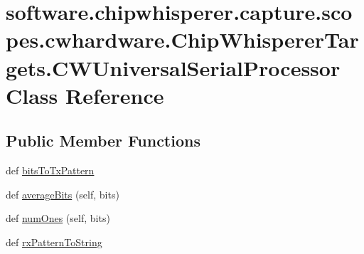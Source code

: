 \hypertarget{classsoftware_1_1chipwhisperer_1_1capture_1_1scopes_1_1cwhardware_1_1ChipWhispererTargets_1_1CWUniversalSerialProcessor}{}\section{software.\+chipwhisperer.\+capture.\+scopes.\+cwhardware.\+Chip\+Whisperer\+Targets.\+C\+W\+Universal\+Serial\+Processor Class Reference}
\label{classsoftware_1_1chipwhisperer_1_1capture_1_1scopes_1_1cwhardware_1_1ChipWhispererTargets_1_1CWUniversalSerialProcessor}
\subsection*{Public Member Functions}
\begin{DoxyCompactItemize}
\item 
def \hyperlink{classsoftware_1_1chipwhisperer_1_1capture_1_1scopes_1_1cwhardware_1_1ChipWhispererTargets_1_1CWUniversalSerialProcessor_a8429b40cbc941da8b450e7facc297aad}{bits\+To\+Tx\+Pattern}
\item 
def \hyperlink{classsoftware_1_1chipwhisperer_1_1capture_1_1scopes_1_1cwhardware_1_1ChipWhispererTargets_1_1CWUniversalSerialProcessor_a6c440a6340a95a9c8a76e99795c412f4}{average\+Bits} (self, bits)
\item 
def \hyperlink{classsoftware_1_1chipwhisperer_1_1capture_1_1scopes_1_1cwhardware_1_1ChipWhispererTargets_1_1CWUniversalSerialProcessor_a284b4beff98546e4a8297710bcd58ea1}{num\+Ones} (self, bits)
\item 
def \hyperlink{classsoftware_1_1chipwhisperer_1_1capture_1_1scopes_1_1cwhardware_1_1ChipWhispererTargets_1_1CWUniversalSerialProcessor_ae9d3a515864c14c7b71a647d88454f6b}{rx\+Pattern\+To\+String}
\end{DoxyCompactItemize}


